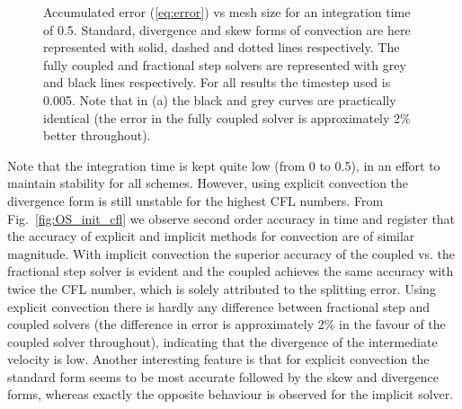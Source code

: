 \begin{figure}
 \centering
 \caption{Accumulated error (\ref{eq:error}) vs mesh size for an integration time of 0.5. Standard, divergence and skew forms of convection are here represented with solid, dashed and dotted lines respectively. The fully coupled and fractional step solvers are represented with grey and black lines respectively. For all results the timestep used is 0.005. Note that in (a) the black and grey curves are practically identical (the error in the fully coupled solver is approximately 2\% better throughout). }
\label{fig:OS_init_dx}
\end{figure}
Note that the integration time is kept quite low (from 0 to 0.5), in an effort to maintain stability for all schemes. However, using explicit convection the divergence form is still unstable for the highest CFL numbers. From Fig.~\ref{fig:OS_init_cfl} we observe second order accuracy in time and register that the accuracy of explicit and implicit methods for convection are of similar magnitude. With implicit convection the superior accuracy of the coupled vs. the fractional step solver is evident and the coupled achieves the same accuracy with twice the CFL number, which is solely attributed to the splitting error. Using explicit convection there is hardly any difference between fractional step and coupled solvers (the difference in error is approximately 2\% in the favour of the coupled solver throughout), indicating that the divergence of the intermediate velocity is low. Another interesting feature is that for explicit convection the standard form seems to be most accurate followed by the skew and divergence forms, whereas exactly the opposite behaviour is observed for the implicit solver.

